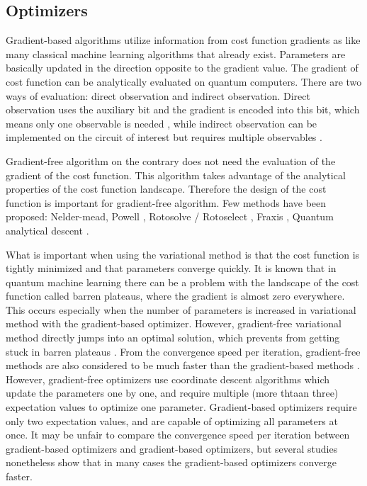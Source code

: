 \subsection{Optimizers}
\par Gradient-based algorithms utilize information from cost function gradients as like many classical machine learning algorithms that already exist. Parameters are basically updated in the direction opposite to the gradient value. The gradient of cost function can be analytically evaluated on quantum computers. There are two ways of evaluation: direct observation and indirect observation. Direct observation uses the auxiliary bit and the gradient is encoded into this bit, which means only one observable is needed \cite{Romero_2019}, while indirect observation can be implemented on the circuit of interest but requires multiple observables \cite{PhysRevResearch.1.013006}.

\par Gradient-free algorithm on the contrary does not need the evaluation of the gradient of the cost function. This algorithm takes advantage of the analytical properties of the cost function landscape. Therefore the design of the cost function is important for gradient-free algorithm. Few methods have been proposed:
Nelder-mead\cite{10.1093/comjnl/7.4.308}, Powell \cite{Pellow_Jarman_2021}, 
Rotosolve / Rotoselect \cite{Nakanishi_2020,Ostaszewski_2021}, Fraxis \cite{fraxis1,Wada_2022}, Quantum analytical descent \cite{koczor}.

\par What is important when using the variational method is that the cost function is tightly minimized and that parameters converge quickly. It is known that in quantum machine learning there can be a problem with the landscape of the cost function called barren plateaus, where the gradient is almost zero everywhere. This occurs especially when the number of parameters is increased in variational method with the gradient-based optimizer. However, gradient-free variational method directly jumps into an optimal solution, which prevents from getting stuck in barren plateaus \cite{book1}. From the convergence speed per iteration, gradient-free methods are also considered to be much faster than the gradient-based methods \cite{TILLY20221}. However, gradient-free optimizers use coordinate descent algorithms which update the parameters one by one, and require multiple (more thtaan three) expectation values to optimize one parameter. Gradient-based optimizers require only two expectation values, and are capable of optimizing all parameters at once. It may be unfair to compare the convergence speed per iteration between gradient-based optimizers and gradient-based optimizers, but several studies nonetheless show that in many cases the gradient-based optimizers converge faster\cite{Ostaszewski_2021,PhysRevResearch.2.043158, https://doi.org/10.48550/arxiv.1912.08660}.
